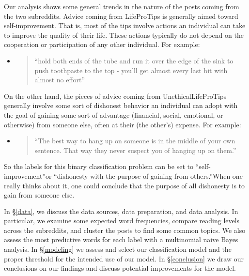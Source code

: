 \documentclass{amsart}
\theoremstyle{definition}
\newtheorem*{probstat}{Problem Statement}
\theoremstyle{remark}
\newcommand{\tql}{\textquotedblleft}
\newcommand{\tqr}{\textquotedblright}
\begin{document}
Our analysis shows some general trends in the nature of the posts coming from the two subreddits. Advice coming from LifeProTips is generally aimed toward self-improvement.  That is, most of the tips involve actions an individual can take to improve the quality of their life. These actions typically do not depend on the cooperation or participation of any other individual.  For example:
\begin{itemize}
\item \begin{quote}
\tql hold both ends of the tube and run it over the edge of the sink to push toothpaste to the top - you'll get almost every last bit with almost no effort\tqr
\end{quote}
\end{itemize}
On the other hand, the pieces of advice coming from UnethicalLifeProTips generally involve some sort of dishonest behavior an individual can adopt with the goal of gaining some sort of advantage (financial, social, emotional, or otherwise) from someone else, often at their (the other's) expense.  For example:
\begin{itemize}
\item \begin{quote}
\tql The best way to hang up on someone is in the middle of your own sentence. That way they never suspect you of hanging up on them.\tqr
\end{quote}
\end{itemize}
So the labels for this binary classification problem can be set to \tql self-improvement\tqr or \tql dishonesty with the purpose of gaining from others.\tqr When one really thinks about it, one could conclude that the purpose of all dishonesty is to gain from someone else.

In \S \ref{data}, we discuss the data sources, data preparation, and data analysis.  In particular, we examine some expected word frequencies, compare reading levels across the subreddits, and cluster the posts to find some common topics. We also assess the most predictive words for each label with a multinomial naive Bayes analysis.  In \S\ref{modeling} we assess and select our classification model and the proper threshold for the intended use of our model.  In \S\ref{conclusion} we draw our conclusions on our findings and discuss potential improvements for the model.



%
\end{document}
